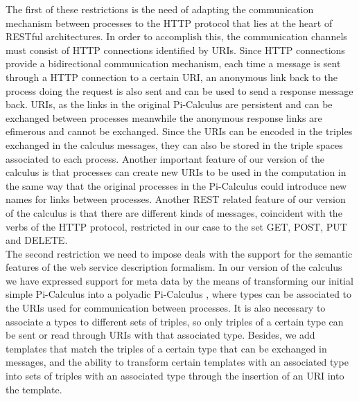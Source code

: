 The first of these restrictions is the need of adapting the communication mechanism between processes to the HTTP
protocol that lies at the heart of RESTful architectures. In order to accomplish this, the communication channels must
consist of HTTP connections identified by URIs. Since HTTP connections provide a bidirectional communication mechanism,
each time a message is sent through a HTTP connection to a certain URI, an anonymous link back to the process doing the
request is also sent and can be used to send a response message back. URIs, as the links in the original Pi-Calculus
are persistent and can be exchanged between processes meanwhile the anonymous response links are efimerous and cannot be
exchanged. Since the URIs can be encoded in the triples exchanged in the calculus messages, they can also be stored in
the triple spaces associated to each process. Another important feature of our version of the calculus is that processes
can create new URIs to be used in the computation in the same way that the original processes in the Pi-Calculus could
introduce new names for links between processes. Another REST related feature of our version of the calculus is that
there are different kinds of messages, coincident with the verbs of the HTTP protocol, restricted in our case to the set
GET, POST, PUT and  DELETE.\\

The second restriction we need to impose deals with the support for the semantic features of the web service description
formalism. In our version of the calculus we have expressed support for meta data by the means of transforming our initial simple
Pi-Calculus into a polyadic Pi-Calculus \cite{Tutorial91thepolyadic}, where types can be associated to the URIs used for communication between
processes. It is also necessary to associate a types to different sets of triples, so only triples of a certain type can
be sent or read through URIs with that associated type. Besides, we add templates that match the triples of a certain
type that can be exchanged in messages, and the ability to transform certain templates with an associated type into
sets of triples with an associated type through the insertion of an URI into the template.\\

